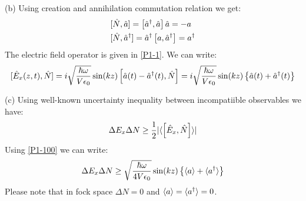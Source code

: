 \begin{homeworkProblem}
\begin{homeworkSection}{(b)}
Using creation and annihilation commutation relation we get:
\begin{align}
&[{\Hat{N}},{\Hat{a}}]=\left[\Hat{a}^{\dagger},\Hat{a}\right]\Hat{a}=-a\\
&[{\Hat{N}},{\Hat{a}^\dagger}]=\Hat{a}^{\dagger}\left[a,\Hat{a}^\dagger\right]=a^\dagger
\end{align}
The electric field operator is given in \eqref{P1-1}. We can write:
\begin{equation}\label{P1-100}
[\Hat{E}_x(z,t),\Hat{N}]=i\sqrt{\frac{\hbar\omega}{V\epsilon_0}}\sin(kz)\left[\Hat{a}(t)-\Hat{a}^{\dagger}(t),\Hat{N}\right]
=i\sqrt{\frac{\hbar\omega}{V\epsilon_0}}\sin(kz)\left\{\Hat{a}(t)+\Hat{a}^{\dagger}(t)\right\}
\end{equation}
\end{homeworkSection}
\begin{homeworkSection}{(c)}
Using well-known uncertainty inequality between incompatiible observables we have:
\begin{equation}
\Delta E_x\Delta N\geq \frac{1}{2}\lvert\langle \left[\Hat{E}_x,\Hat{N}\right]\rangle\rvert
\end{equation}
Using \eqref{P1-100} we can write:
\begin{equation}
\Delta E_x\Delta N\geq \sqrt{\frac{\hbar\omega}{4V\epsilon_0}}\sin(kz)\left\{\langle a\rangle+\langle a^\dagger\rangle\right\}
\end{equation}
Please note that in fock space $\Delta N=0$ and $\langle a\rangle=\langle a^\dagger\rangle=0$.
\end{homeworkSection}







\end{homeworkProblem}